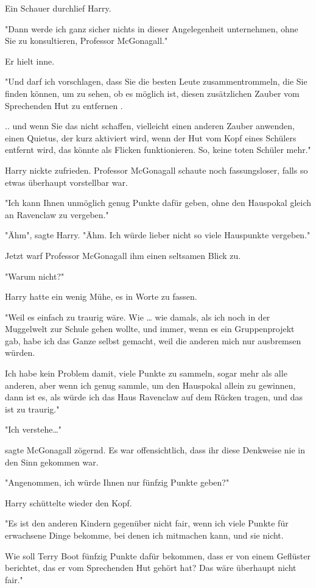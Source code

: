 {Ein Schauer durchlief Harry.

"Dann werde ich ganz sicher nichts in dieser Angelegenheit unternehmen, ohne Sie zu konsultieren, Professor McGonagall."

Er hielt inne.

"Und darf ich vorschlagen, dass Sie die besten Leute zusammentrommeln, die Sie finden können, um zu sehen, ob es möglich ist, diesen zusätzlichen Zauber vom Sprechenden Hut zu entfernen .

.. und wenn Sie das nicht schaffen, vielleicht einen anderen Zauber anwenden, einen Quietus, der kurz aktiviert wird, wenn der Hut vom Kopf eines Schülers entfernt wird, das könnte als Flicken funktionieren. So, keine toten Schüler mehr."

Harry nickte zufrieden. Professor McGonagall schaute noch fassungsloser, falls so etwas überhaupt vorstellbar war.

"Ich kann Ihnen unmöglich genug Punkte dafür geben, ohne den Hauspokal gleich an Ravenclaw zu vergeben."

"Ähm", sagte Harry. "Ähm. Ich würde lieber nicht so viele Hauspunkte vergeben."

Jetzt warf Professor McGonagall ihm einen seltsamen Blick zu.

"Warum nicht?"

Harry hatte ein wenig Mühe, es in Worte zu fassen.

"Weil es einfach zu traurig wäre. Wie … wie damals, als ich noch in der Muggelwelt zur Schule gehen wollte, und immer, wenn es ein Gruppenprojekt gab, habe ich das Ganze selbst gemacht, weil die anderen mich nur ausbremsen würden.

Ich habe kein Problem damit, viele Punkte zu sammeln, sogar mehr als alle anderen, aber wenn ich genug sammle, um den Hauspokal allein zu gewinnen, dann ist es, als würde ich das Haus Ravenclaw auf dem Rücken tragen, und das ist zu traurig."

"Ich verstehe…"

sagte McGonagall zögernd. Es war offensichtlich, dass ihr diese Denkweise nie in den Sinn gekommen war.

"Angenommen, ich würde Ihnen nur fünfzig Punkte geben?"

Harry schüttelte wieder den Kopf.

"Es ist den anderen Kindern gegenüber nicht fair, wenn ich viele Punkte für erwachsene Dinge bekomme, bei denen ich mitmachen kann, und sie nicht.

Wie soll Terry Boot fünfzig Punkte dafür bekommen, dass er von einem Geflüster berichtet, das er vom Sprechenden Hut gehört hat? Das wäre überhaupt nicht fair."

}
